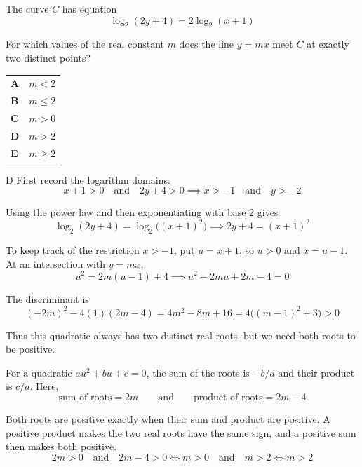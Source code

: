\documentclass[11pt,a4paper]{article}
\begin{document}
\clearpage
\thispagestyle{djssolutions}
\vspace*{8pt}
\begin{enumerate}[label=\textbf{\arabic*.},leftmargin=*,itemsep=0pt,start=19]
The curve $C$ has equation
\[\log_2(2y+4)=2\log_2(x+1)\]

For which values of the real constant $m$ does the line $y=mx$ meet $C$ at exactly two distinct points?

\par\vspace*{12pt}
\begin{tabularx}{\linewidth}{@{}>{\bfseries}l Y@{}}
A &
$m<2$
\\[0.8em]
B &
$m\le 2$
\\[0.8em]
C &
$m>0$
\\[0.8em]
D &
$m>2$
\\[0.8em]
E &
$m\ge 2$
\\
\end{tabularx}

\begin{djsSolution}{D}
First record the logarithm domains:
\[
x+1>0\quad\text{and}\quad 2y+4>0
\implies x>-1\quad\text{and}\quad y>-2
\]

Using the power law and then exponentiating with base $2$ gives
\[
\log_2(2y+4)=\log_2\bigl((x+1)^2\bigr)
\implies 2y+4=(x+1)^2
\]

To keep track of the restriction $x>-1$, put $u=x+1$, so $u>0$ and $x=u-1$. At an intersection with $y=mx$,
\[
u^2=2m(u-1)+4
\implies u^2-2mu+2m-4=0
\]

The discriminant is
\[
(-2m)^2-4(1)(2m-4)
=4m^2-8m+16
=4\bigl((m-1)^2+3\bigr)>0
\]

Thus this quadratic always has two distinct real roots, but we need both roots to be positive.

For a quadratic $au^2+bu+c=0$, the sum of the roots is $-b/a$ and their product is $c/a$. Here,
\[
\text{sum of roots}=2m
\qquad\text{and}\qquad
\text{product of roots}=2m-4
\]

Both roots are positive exactly when their sum and product are positive. A positive product makes the two real roots have the same sign, and a positive sum then makes both positive.
\[
2m>0\quad\text{and}\quad 2m-4>0
\iff m>0\quad\text{and}\quad m>2
\iff \boxed{m>2}
\]


\end{djsSolution}
\end{enumerate}
\end{document}

